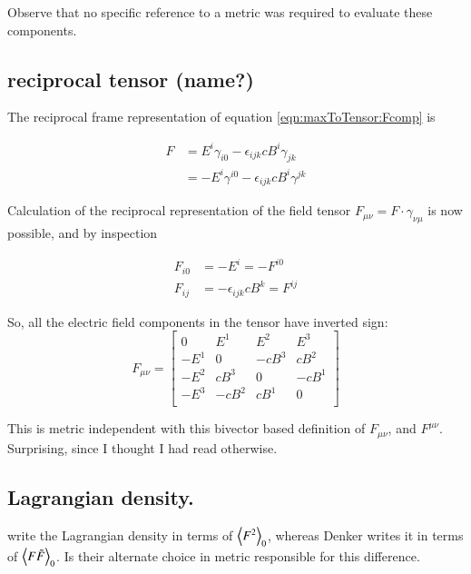 Observe that no specific reference to a metric was required to evaluate these components.

\subsection{reciprocal tensor (name?) }

The reciprocal frame representation of equation \ref{eqn:maxToTensor:Fcomp} is %

\begin{align*}
F
&= E^i \gamma_{i 0} - \epsilon_{i j k} c B^i \gamma_{j k} \\
&= -E^i \gamma^{i 0} - \epsilon_{i j k} c B^i \gamma^{j k}
\end{align*}


Calculation of the reciprocal representation of the field tensor $F_{{\mu} {\nu}} = F \cdot \gamma_{\nu\mu}$ is now possible, and by inspection

\begin{align*}
F_{i0} &= -E^i = -F^{i0} \\
F_{ij} &= - \epsilon_{i j k} c B^k = F^{ij}
\end{align*}

So, all the electric field components in the tensor have inverted sign:
\begin{equation*}
F_{\mu\nu} =
\begin{bmatrix}
0   & E^1 & E^2 & E^3 \\
-E^1 &   0  & -c B^3 &  c B^2 \\
-E^2 &  c B^3 &   0  & -c B^1 \\
-E^3 & -c B^2 &  c B^1 &   0  \\
\end{bmatrix}
\end{equation*}

This is metric independent with this bivector based definition of $F_{\mu\nu}$, and $F^{\mu\nu}$.  Surprising, since I thought I had read otherwise.

\subsection{Lagrangian density. }

\cite{doran2003gap}
write the Lagrangian density in terms of ${\left\langle{{F^2}}\right\rangle}_{0}$, whereas Denker writes it in terms of ${\left\langle{{F \tilde{F}}}\right\rangle}_{0}$.  Is their
alternate choice in metric responsible for this difference.

